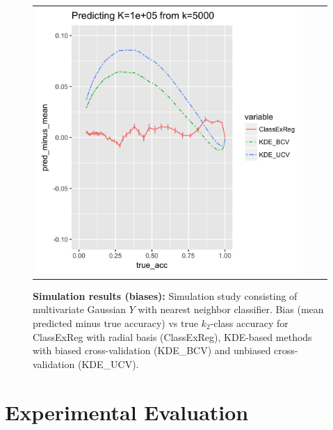 \documentclass[twoside,11pt]{article}
\begin{document}
\begin{figure}[p]
\begin{tabular}{ccc}
\includegraphics[scale = 0.45, clip = true, trim = .3in 0 0.00in 0.4in]{sim_large7_biaz_K100_k5.png}\\ 
\end{tabular}
\caption{\textbf{Simulation results (biases):} Simulation study
  consisting of multivariate Gaussian $Y$ with nearest neighbor
  classifier.  Bias (mean predicted minus true accuracy) vs true $k_2$-class accuracy
  for ClassExReg with radial basis (\textsf{ClassExReg}), KDE-based methods with biased cross-validation (\textsf{KDE\_BCV}) and unbiased cross-validation (\textsf{KDE\_UCV}).}
\label{fig:sim_study_bias}
\end{figure}





\section{Experimental Evaluation}\label{sec:extrapolation_example}
\end{document}
